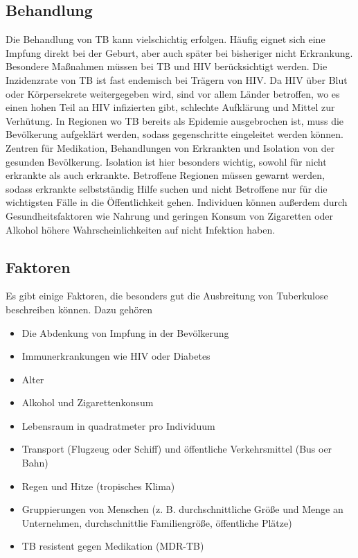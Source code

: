 \documentclass[paper=a4, fontsize=11pt, ngerman, abstract=on]{scrartcl}
\numberwithin{equation}{section} %
\numberwithin{figure}{section} %
\numberwithin{table}{section} %
\begin{document}
\subsection{Behandlung}

Die Behandlung von TB kann vielschichtig erfolgen. Häufig eignet sich eine Impfung direkt bei der Geburt, aber auch später bei bisheriger nicht Erkrankung. Besondere Maßnahmen müssen bei TB und HIV berücksichtigt werden. Die Inzidenzrate von TB ist fast endemisch bei Trägern von HIV. Da HIV über Blut oder Körpersekrete weitergegeben wird, sind vor allem Länder betroffen, wo es einen hohen Teil an HIV infizierten gibt, schlechte Aufklärung und Mittel zur Verhütung. In Regionen wo TB bereits als Epidemie ausgebrochen ist, muss die Bevölkerung aufgeklärt werden, sodass gegenschritte eingeleitet werden können. Zentren für Medikation, Behandlungen von Erkrankten und Isolation von der gesunden Bevölkerung. Isolation ist hier besonders wichtig, sowohl für nicht erkrankte als auch erkrankte. Betroffene Regionen müssen gewarnt werden, sodass erkrankte selbstständig Hilfe suchen und nicht Betroffene nur für die wichtigsten Fälle in die Öffentlichkeit gehen. Individuen können außerdem durch Gesundheitsfaktoren wie Nahrung und geringen Konsum von Zigaretten oder Alkohol höhere Wahrscheinlichkeiten auf nicht Infektion haben. \cite{WHOTBGuidelines2017}

\subsection{Faktoren}

Es gibt einige Faktoren, die besonders gut die Ausbreitung von Tuberkulose beschreiben können. Dazu gehören

\begin{itemize}
\item Die Abdenkung von Impfung in der Bevölkerung
\item Immunerkrankungen wie HIV oder Diabetes
\item Alter
\item Alkohol und Zigarettenkonsum
\item Lebensraum in quadratmeter pro Individuum
\item Transport (Flugzeug oder Schiff) und öffentliche Verkehrsmittel (Bus oer Bahn)
\item Regen und Hitze (tropisches Klima)
\item Gruppierungen von Menschen (z. B. durchschnittliche Größe und Menge an Unternehmen, durchschnittlie Familiengröße, öffentliche Plätze)
\item TB resistent gegen Medikation (MDR-TB)
\end{itemize}
\end{document}
